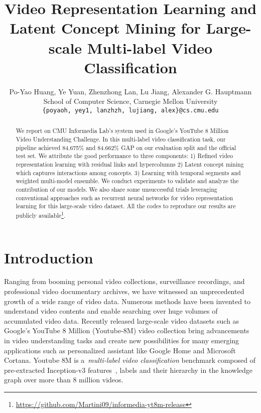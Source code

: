 \documentclass[10pt,twocolumn,letterpaper]{article}
\begin{document}
\title{Video Representation Learning and Latent Concept Mining for Large-scale Multi-label Video Classification}



\author{Po-Yao Huang, Ye Yuan, Zhenzhong Lan, Lu Jiang, Alexander G. Hauptmann \\
School of Computer Science, Carnegie Mellon University\\
{\tt\small \{poyaoh, yey1, lanzhzh, lujiang, alex\}@cs.cmu.edu}
}



\maketitle

\begin{abstract}
We report on CMU Informedia Lab's system used in Google's YouTube 8 Million Video Understanding Challenge. In this multi-label video classification task, our pipeline achieved 84.675\% and 84.662\% GAP on our evaluation split and the official test set. We attribute the good performance to three components: 1) Refined video representation learning with residual links and hypercolumns 2) Latent concept mining which captures interactions among concepts. 3) Learning with temporal segments and weighted multi-model ensemble. We conduct experiments to validate and analyze the contribution of our models. We also share some unsuccessful trials leveraging conventional approaches such as recurrent neural networks for video representation learning for this large-scale video dataset. All the codes to reproduce our results are publicly available\footnote{\url{https://github.com/Martini09/informedia-yt8m-release}}.
\end{abstract}


\section{Introduction}
Ranging from booming personal video collections, surveillance recordings, and professional video documentary archives, we have witnessed an unprecedented growth of a wide range of video data. Numerous methods have been invented to understand video contents and enable searching over huge volumes of accumulated video data. Recently released large-scale video datasets such as Google's YouTube 8 Million (Youtube-8M) video collection bring advancements in video understanding tasks and create new possibilities for many emerging applications such as personalized assistant like Google Home and Microsoft Cortana. Youtube 8M is a~\textit{multi-label video classification} benchmark composed of pre-extracted Inception-v3 features~\cite{szegedy2016rethinking}, labels and their hierarchy in the knowledge graph over more than 8 million videos.
\end{document}
